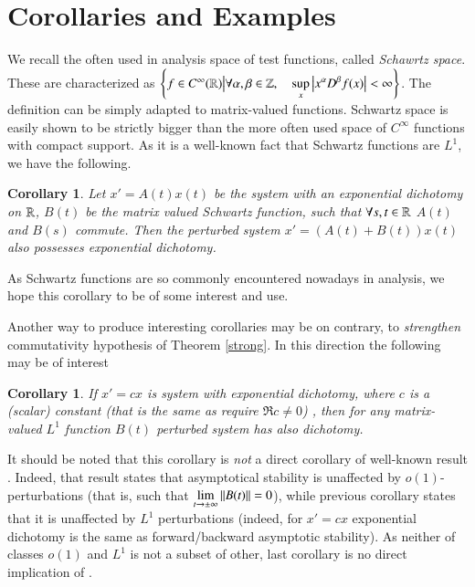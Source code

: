 \documentclass{elsarticle}
\newtheorem{corollary}[proposition]{Corollary}
\theoremstyle{remark}
\begin{document}
\section{Corollaries and Examples}
We recall the often used in analysis space of test functions, called \textit{Schawrtz space}. These are characterized
as $\mysetn{f\in C^{\infty}(\R)}{\forall \alpha,\beta\in\Z,\quad\sup_x\myabs{x^\alpha D^\beta f(x)}<\infty}$.
The definition can be simply adapted to matrix-valued functions.
Schwartz space is easily shown to be strictly bigger than the more often used space of $C^\infty$ functions with compact support.
As it is a well-known fact that Schwartz functions are $L^1$, we have the following.
\begin{corollary}
	Let $x'=A(t)x(t)$ be the system with an exponential dichotomy on $\mathbb{R}$, $B(t)$ be the matrix valued Schwartz function,
 	such that $\forall s,t\in\mathbb{R}$
	$A(t)$ and $B(s)$ commute. Then the perturbed system $x'=(A(t)+B(t))x(t)$ also possesses exponential dichotomy.
\end{corollary}
As Schwartz functions are so commonly encountered nowadays in analysis, we hope this corollary to be of some interest and use.

Another way to produce interesting corollaries may be on contrary, to \textit{strengthen} commutativity hypothesis of Theorem
\ref{strong}. In this direction the following may be of interest
\begin{corollary}
	If $x'=cx$ is system with exponential dichotomy, where $c$ is a (scalar) constant (that is the same as require $\Re c\neq0$)
	, then for \textit{any} matrix-valued $L^1$ function $B(t)$ perturbed system has also dichotomy.
\end{corollary}
It should be noted that this corollary is \textit{not} a direct corollary of well-known result 
\cite[Corollary 3.21]{teschlordinary}. Indeed, that result states that asymptotical stability is unaffected by 
$o(1)$-perturbations (that is, such that $\lim_{t\to\pm\infty}\mynorm{B(t)}=0$), while previous corollary states that
it is unaffected by $L^1$ perturbations (indeed, for $x'=cx$ exponential dichotomy is the same as forward/backward asymptotic
stability). As neither of classes $o(1)$ and $L^1$ is not a subset of other, last corollary is no direct implication of
\cite[Corollary 3.21]{teschlordinary}.
\end{document}
